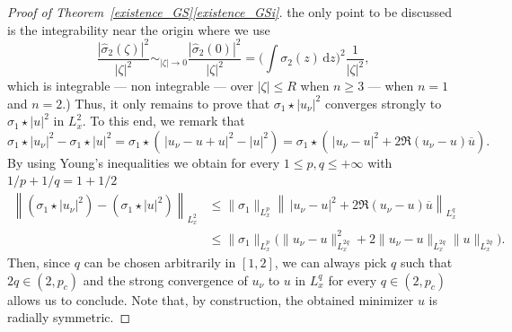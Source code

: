 \documentclass[JEP,XML,SOM,NoEqCountersInSection,NoFloatCountersInSection,Unicode,published]{cedram}
\let\bar\oldbar
\theoremstyle{definition}
\let\bar\overline
\newenvironment{ProofOf}[1]{\begin{proof}[Proof of #1]}{\end{proof}}
\newcommand{\ud}{\, {\mathrm{d}}}
\begin{document}
\begin{ProofOf}{Theorem~\ref{existence_GS}\eqref{existence_GSi}}
the only point to be discussed is the integrability near the origin where we use
\[
\frac{|\widehat{\sigma}_{2}(\zeta)|^2}{|\zeta|^2}\sim_{|\zeta|\to 0} \frac{|\widehat{\sigma}_{2}(0)|^2}{|\zeta|^2}
=\biggl(\int \sigma_2(z)\ud z\biggr)^2\frac{1}{|\zeta|^2},
\]
which is integrable --- \resp non integrable --- over $|\zeta|\leq R$ when $n\geq 3$ --- \resp when $n=1$ and $n=2$.)
Thus, it only remains to prove that $\sigma_{1}\star|u_{\nu}|^{2}$ converges strongly to $\sigma_{1}\star|u|^{2}$ in $L_{x}^{2}$. To this end, we remark that
\[
\sigma_{1}\star|u_{\nu}|^{2}-\sigma_{1}\star|u|^{2}=\sigma_{1}\star\left(\,|u_{\nu}-u+u|^{2}-|u|^{2}\right)=\sigma_{1}\star\left(\,|u_{\nu}-u|^{2}+2\Re (u_{\nu}-u)\bar{u}\right).
\]
By using Young's inequalities \cite[Th.\,4.2]{LL} we obtain for every $1\leq p,q\leq+\infty$ with $1/p+1/q=1+1/2$
\begin{align*}
\left\|(\sigma_{1}\star|u_{\nu}|^{2})-(\sigma_{1}\star|u|^{2})\right\|_{L_{x}^{2}}&\leq\|\sigma_{1}\|_{L_{x}^{p}}\left\|\,|u_{\nu}-u|^{2}+2\Re (u_{\nu}-u)\bar{u}\right\|_{L_{x}^{q}}\\
&\leq\|\sigma_{1}\|_{L_{x}^{p}}\bigl(\|u_{\nu}-u\|_{L_{x}^{2q}}^{2}+2\|u_{\nu}-u\|_{L_{x}^{2q}}\|u\|_{L_{x}^{2q}}\bigr).
\end{align*}
Then, since $q$ can be chosen arbitrarily in $[1,2]$, we can always pick $q$ such that $2q\in(2,p_{c})$ and the strong convergence of $u_{\nu}$ to $u$ in $L_{x}^{q}$ for every $q\in(2,p_{c})$ allows us to conclude.
Note that, by construction, the obtained minimizer $u$ is radially symmetric.
\end{ProofOf}
\end{document}
